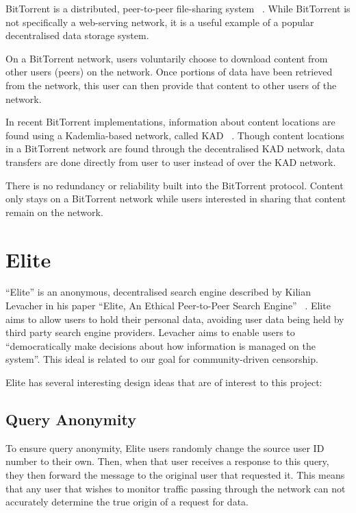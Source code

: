 BitTorrent is a distributed, peer-to-peer file-sharing system ~\cite{torrent}. While BitTorrent is not specifically a
web-serving network, it is a useful example of a popular decentralised data storage system.

On a BitTorrent network, users voluntarily choose to download content from other users (peers) on the network.
Once portions of data have been retrieved from the network, this user can then provide that content to other
users of the network.

In recent BitTorrent implementations, information about content locations are found using a Kademlia-based network,
called KAD ~\cite{torrentkad}. Though content locations in a BitTorrent network are found through the decentralised
KAD network, data transfers are done directly from user to user instead of over the KAD network.

There is no redundancy or reliability built into the BitTorrent protocol. Content only stays on a BitTorrent network while
users interested in sharing that content remain on the network.

\section{Elite}

``Elite'' is an anonymous, decentralised search engine described by Kilian Levacher in his paper
``Elite, An Ethical Peer-to-Peer Search Engine'' ~\cite{levacher}. Elite aims to allow users to hold their
personal data, avoiding user data being held by third party search engine providers.
Levacher aims to enable users to ``democratically make decisions about how information is managed on the system''.
This ideal is related to our goal for community-driven censorship.

Elite has several interesting design ideas that are of interest to this project:

\subsection{Query Anonymity}

To ensure query anonymity, Elite users randomly change the source user ID number to their own. Then, when that user
receives a response to this query, they then forward the message to the original user that requested it. This means
that any user that wishes to monitor traffic passing through the network can not accurately determine the true
origin of a request for data.

